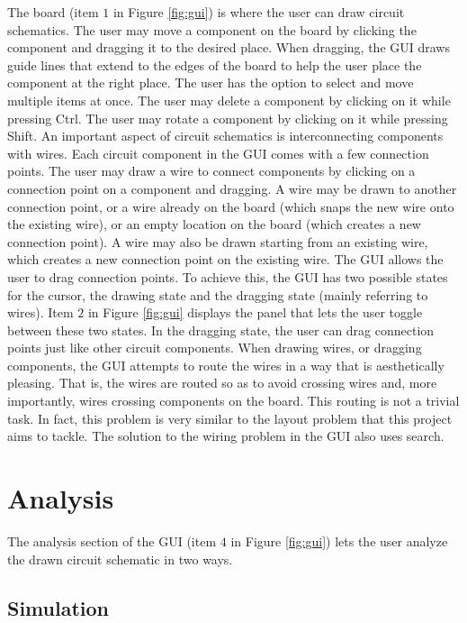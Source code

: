The board (item $1$ in Figure \ref{fig:gui}) is where the user can draw circuit
schematics. The user may move a component on the board by clicking the component
and dragging it to the desired place. When dragging, the GUI draws guide lines
that extend to the edges of the board to help the user place the component
at the right place. The user has the option to select and move multiple items at
once. The user may delete a component by clicking on it while
pressing Ctrl. The user may rotate a component by clicking on it
while pressing Shift. An important aspect of circuit schematics is
interconnecting components with wires. Each circuit component in the GUI comes
with a few connection points. The user may draw a wire to connect
components by clicking on a connection point on a component and dragging.
A wire may be drawn to another connection
point, or a wire already on the board (which snaps the new wire onto the
existing wire), or an empty location on the board (which creates a new
connection point). A wire may also be drawn starting from an existing wire,
which creates a new connection point on the existing wire. The GUI allows the
user to drag connection points. To achieve this, the GUI has two possible
states for the cursor, the drawing state and the dragging state (mainly
referring to wires). Item $2$ in Figure \ref{fig:gui} displays the panel that
lets the user toggle between these two states. In the dragging state, the user
can drag connection points just like other circuit components.
When drawing wires, or dragging components,
the GUI attempts to route the wires in a way that is aesthetically pleasing.
That is, the wires are routed so as to avoid crossing wires and,
more importantly,
wires crossing components on the board. This routing is not a trivial
task. In fact, this problem is very similar to the layout problem that this
project aims to tackle. The solution to the wiring problem in the GUI also uses
search.

\section{Analysis}

The analysis section of the GUI (item $4$ in Figure \ref{fig:gui}) lets the user
analyze the drawn circuit schematic in two ways.

\subsection{Simulation}


